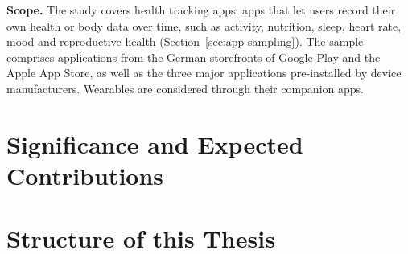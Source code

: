 \documentclass[twoside,its]{bossthesis}
\makeatletter
\newif\ifshowhighlights
\def\hl@ulpreamble{\SOUL@hlpreamble
  \hl@lnht=-\SOUL@uldp \advance\hl@lnht by \hl@lnthick}
\def\hl@ulleaders{\xleaders\hbox to 1pt{%
  \rlap{\vrule width 1.2pt height \SOUL@ulht depth \SOUL@uldp}%
  \rlap{\textcolor{todoline}{\vrule width 1.2pt height \hl@lnht depth \SOUL@uldp}}\hss}}
\DeclareRobustCommand*\texthlul{\SOUL@hlsetup
  \let\SOUL@preamble\hl@ulpreamble \let\SOUL@ulleaders\hl@ulleaders \SOUL@}
\newcommand{\hl@plain}[2]{{\sethlcolor{#1}\hl{#2}}}
\newcommand{\hl@marked}[2]{{\sethlcolor{#1}\texthlul{#2}}}
\newcommand{\hl@off}[2]{#2}
\newcommand{\hl@on}[2]{\@ifnextchar\todo{\hl@marked{#1}{#2}}{\hl@plain{#1}{#2}}}
\newcommand{\highlight}[2][yellow]{%
  \ifshowhighlights
    \expandafter\hl@on %
  \else
    \expandafter\hl@off
  \fi
  {#1}{#2}}
\makeatother
\begin{document}
\noindent\textbf{Scope.} The study covers health tracking apps: apps that let
users record their own health or body data over time, such as activity,
nutrition, sleep, heart rate, mood and reproductive health
(Section~\ref{sec:app-sampling}).
The sample comprises applications from the German storefronts of Google Play and the Apple App Store, as well as the three major applications pre-installed by device manufacturers.
Wearables are considered through their companion apps.

\section{Significance and Expected Contributions}

%
%

\section{Structure of this Thesis} 




\end{document}
